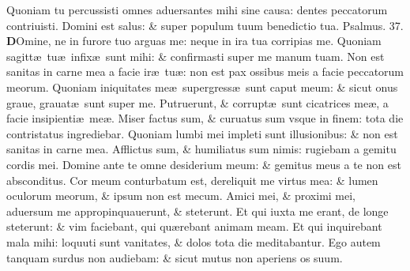 \documentclass[a5paper,10pt]{book}
\def\ae{æ}
\begin{document}
\begin{multicols*}{2}
\newline \color{red} Q\color{black}uoniam tu percussisti omnes aduersantes mihi sine causa: dentes peccatorum contriuisti.
\newline \color{red} D\color{black}omini est salus: \& super populum tuum benedictio tua. \quad \color{red} Psalmus. \hypertarget{ps37}{37.} \color{black}
\vspace{-.5em}
\lettrine[lines=2]{\bfseries \color{red} D}{}Omine, ne in furore tuo arguas me: neque in ira tua corripias me.
\newline \color{red} Q\color{black}uoniam sagitt\ae \ tu\ae \ infix\ae \ sunt mihi: \& confirmasti super me manum tuam.
\newline \color{red} N\color{black}on est sanitas in carne mea a facie ir\ae \ tu\ae : non est pax ossibus meis a facie peccatorum meorum.
\newline \color{red} Q\color{black}uoniam iniquitates me\ae \ supergress\ae \ sunt caput meum: \& sicut onus graue, grauat\ae \ sunt super me.
\newline \color{red} P\color{black}utruerunt, \& corrupt\ae \ sunt cicatrices me\ae , a facie insipienti\ae \ me\ae .
\newline \color{red} M\color{black}iser factus sum, \& curuatus sum vsque in finem: tota die contristatus ingrediebar.
\newline \color{red} Q\color{black}uoniam lumbi mei impleti sunt illusionibus: \& non est sanitas in carne mea.
\newline \color{red} A\color{black}fflictus sum, \& humiliatus sum nimis: rugiebam a gemitu cordis mei.
\newline \color{red} D\color{black}omine ante te omne desiderium meum: \& gemitus meus a te non est absconditus.
\newline \color{red} C\color{black}or meum conturbatum est, dereliquit me virtus mea: \& lumen oculorum meorum, \& ipsum non est mecum.
\newline \color{red} A\color{black}mici mei, \& proximi mei, aduersum me appropinquauerunt, \& steterunt.
\newline \color{red} E\color{black}t qui iuxta me erant, de longe steterunt: \& vim faciebant, qui qu\ae rebant animam meam.
\newline \color{red} E\color{black}t qui inquirebant mala mihi: loquuti sunt vanitates, \& dolos tota die meditabantur.
\newline \color{red} E\color{black}go autem tanquam surdus non audiebam: \& sicut mutus non aperiens os suum.

\end{multicols*}
\end{document}
